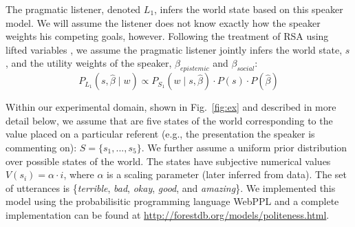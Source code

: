 \documentclass[10pt,letterpaper]{article}
\newcommand{\denote}[1]{\mbox{ $[\![ #1 ]\!]$}}
\newcommand{\mht}[1]{\textcolor{DarkOrange}{[mht: #1]}}
\newcommand{\ejy}[1]{\textcolor{Blue}{[ejy: #1]}}
\begin{document}
The pragmatic listener, denoted $L_1$, infers the world state based on this speaker model.
We will assume the listener does not know exactly how the speaker weights his competing goals, however.
Following the treatment of RSA using lifted variables \cite{GoodmanLassiter2015, bergen2016, Kao2014},
we assume the pragmatic listener jointly infers the world state, $s$, and the utility weights of the speaker, $\beta_{epistemic}$ and $\beta_{social}$:
\begin{equation}
P_{L_1}(s,  \hat{\beta} \mid w)\propto P_{S_1}(w \mid s,  \hat{\beta})\cdot P(s) \cdot P( \hat{\beta}) \label{eq:L1}
\end{equation}

%

Within our experimental domain, shown in Fig.~\ref{fig:ex} and described in more detail below, we assume that are five states of the world corresponding to the value placed on a particular referent (e.g., the presentation the speaker is commenting on): $S = \{s_{1}, ...,  s_{5}\}$.
We further assume a uniform prior distribution over possible states of the world.
The states have subjective numerical values $V(s_{i}) = \alpha \cdot i$, where $\alpha$ is a scaling parameter (later inferred from data).
The set of utterances is \{\emph{terrible}, \emph{bad}, \emph{okay}, \emph{good}, and \emph{amazing}\}.
We implemented this model using the probabilisitic programming language WebPPL \cite{dippl} and a complete implementation can be found at \url{http://forestdb.org/models/politeness.html}.
\end{document}
